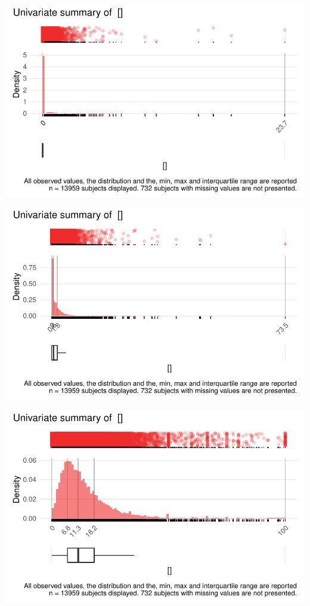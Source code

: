 \documentclass[
  letterpaper,
  DIV=11,
  numbers=noendperiod]{scrreport}
\begin{document}
\includegraphics{./Bact_univar_files/figure-pdf/uni04-32.pdf}

\includegraphics{./Bact_univar_files/figure-pdf/uni04-33.pdf}

\includegraphics{./Bact_univar_files/figure-pdf/uni04-34.pdf}
\end{document}

